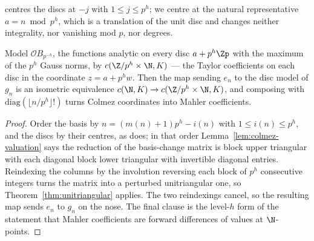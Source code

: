 \cite{Colmez} centres the discs at $-j$ with $1\leq j\leq p^{h}$; we centre at the natural
representative $a = n\bmod p^{h}$, which is a translation of the unit disc and changes neither
integrality, nor vanishing mod $p$, nor degrees.

\begin{theorem}
  \label{thm:amice}
  \leanok
  Model $\mathcal{O}B_{p^{-h}}$, the functions analytic on every disc $a+p^{h}\Zp$ with the
  maximum of the $p^{h}$ Gauss norms, by $c(\Z/p^{h}\times\N, K)$ --- the Taylor coefficients on
  each disc in the coordinate $z = a+p^{h}w$.  Then the map sending $e_n$ to the disc model of
  $g_n$ is an isometric equivalence $c(\N,K) \to c(\Z/p^{h}\times\N,K)$, and composing with
  $\mathrm{diag}(\lfloor n/p^{h}\rfloor!)$ turns Colmez coordinates into Mahler coefficients.
\end{theorem}

\begin{proof}
  \leanok
  Order the basis by $n = (m(n)+1)p^{h} - i(n)$ with $1\leq i(n)\leq p^{h}$, and the discs by
  their centres, as \cite{Colmez} does; in that order Lemma~\ref{lem:colmez-valuation} says the
  reduction of the basis-change matrix is block upper triangular with each diagonal block lower
  triangular with invertible diagonal entries.  Reindexing the columns by the involution
  reversing each block of $p^{h}$ consecutive integers turns the matrix into a perturbed
  unitriangular one, so Theorem~\ref{thm:unitriangular} applies.  The two reindexings cancel, so
  the resulting map sends $e_n$ to $g_n$ on the nose.  The final clause is the level-$h$ form of
  the statement that Mahler coefficients are forward differences of values at $\N$-points.
\end{proof}


